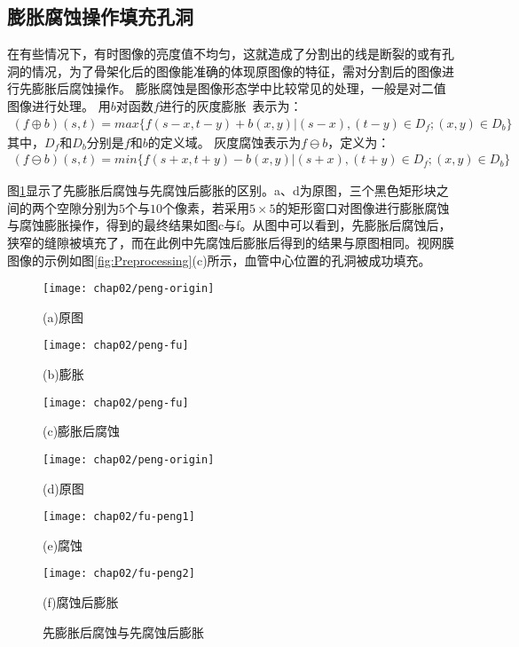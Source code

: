 \subsection{膨胀腐蚀操作填充孔洞}
在有些情况下，有时图像的亮度值不均匀，这就造成了分割出的线是断裂的或有孔洞的情况，为了骨架化后的图像能准确的体现原图像的特征，需对分割后的图像进行先膨胀后腐蚀操作。
膨胀腐蚀是图像形态学中比较常见的处理，一般是对二值图像进行处理。
用$b$对函数$f$进行的灰度膨胀~\cite{gang}表示为：
\begin{align}
(f\oplus b)(s,t)=max\{f(s-x, t-y)+b(x,y)|(s-x),(t-y)\in D_f;(x,y)\in D_b\}
\end{align}
其中，$D_f$和$D_b$分别是$f$和$b$的定义域。
灰度腐蚀表示为$f \ominus b$，定义为：
\begin{align}
(f \ominus b)(s,t)=min\{f(s+x, t+y)-b(x,y)|(s+x),(t+y)\in D_f;(x,y)\in D_b\}
\end{align}

图\ref{fig:peng-fu}显示了先膨胀后腐蚀与先腐蚀后膨胀的区别。a、d为原图，三个黑色矩形块之间的两个空隙分别为$5$个与$10$个像素，若采用$5\times5$的矩形窗口对图像进行膨胀腐蚀与腐蚀膨胀操作，得到的最终结果如图c与f。从图中可以看到，先膨胀后腐蚀后，狭窄的缝隙被填充了，而在此例中先腐蚀后膨胀后得到的结果与原图相同。视网膜图像的示例如图\ref{fig:Preprocessing}(c)所示，血管中心位置的孔洞被成功填充。

\begin{figure}
\centering
  \begin{minipage}[b]{0.3\textwidth} 
      \centering 
      \texttt{[image: chap02/peng-origin]}
        \centerline{(a)原图}\medskip
    \end{minipage}
  \begin{minipage}[b]{0.3\textwidth}
    \centering
    \texttt{[image: chap02/peng-fu]}
      \centerline{(b)膨胀}\medskip
  \end{minipage}
  \begin{minipage}[b]{0.3\textwidth}
    \centering
    \texttt{[image: chap02/peng-fu]}
      \centerline{(c)膨胀后腐蚀}\medskip
  \end{minipage}
   \begin{minipage}[b]{0.3\textwidth} 
      \centering 
      \texttt{[image: chap02/peng-origin]}
        \centerline{(d)原图}\medskip
    \end{minipage}
  \begin{minipage}[b]{0.3\textwidth}
    \centering
    \texttt{[image: chap02/fu-peng1]}
      \centerline{(e)腐蚀}\medskip
  \end{minipage}
  \begin{minipage}[b]{0.3\textwidth}
    \centering
    \texttt{[image: chap02/fu-peng2]}
      \centerline{(f)腐蚀后膨胀}\medskip
  \end{minipage}
\caption{先膨胀后腐蚀与先腐蚀后膨胀}
\label{fig:peng-fu}
\end{figure}

